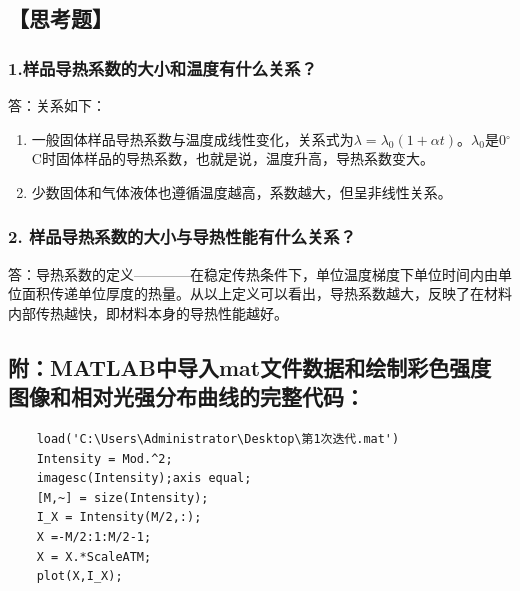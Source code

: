 \documentclass[12pt,a4paper,UTF8,fontset=fandol]{ctexart}
\begin{document}
\subsection*{【思考题】}

	\subsubsection*{1.样品导热系数的大小和温度有什么关系？}
	答：关系如下：
	\begin{enumerate}[(1)]
			\item 一般固体样品导热系数与温度成线性变化，关系式为$\lambda=\lambda_0(1+\alpha t)$。$\lambda_0$是0$^{\circ}$C时固体样品的导热系数，也就是说，温度升高，导热系数变大。
			\item 少数固体和气体液体也遵循温度越高，系数越大，但呈非线性关系。
	\end{enumerate}

	\subsubsection*{2. 样品导热系数的大小与导热性能有什么关系？}
	答：导热系数的定义————在稳定传热条件下，单位温度梯度下单位时间内由单位面积传递单位厚度的热量。从以上定义可以看出，导热系数越大，反映了在材料内部传热越快，即材料本身的导热性能越好。


\newpage %
\subsection*{附：MATLAB中导入mat文件数据和绘制彩色强度图像和相对光强分布曲线的完整代码：}

	\begin{lstlisting}
	load('C:\Users\Administrator\Desktop\第1次迭代.mat')
	Intensity = Mod.^2;
	imagesc(Intensity);axis equal;
	[M,~] = size(Intensity);
	I_X = Intensity(M/2,:);
	X =-M/2:1:M/2-1;
	X = X.*ScaleATM;
	plot(X,I_X);
	\end{lstlisting}
\end{document}

